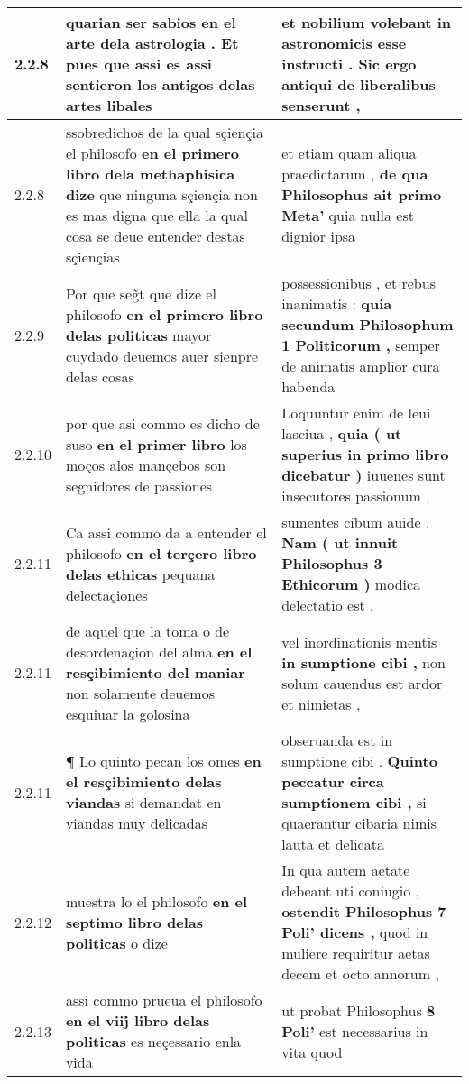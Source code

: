 \begin{tabular}{|p{1cm}|p{6.5cm}|p{6.5cm}|}
2.2.8 & quarian ser sabios \textbf{ en el arte dela astrologia . } Et pues que assi es assi sentieron los antigos delas artes libales & et nobilium volebant \textbf{ in astronomicis esse instructi . } Sic ergo antiqui de liberalibus senserunt , \\\hline
2.2.8 & ssobredichos de la qual sçiençia el philosofo \textbf{ en el primero libro dela methaphisica dize } que ninguna sçiençia non es mas digna que ella la qual cosa se deue entender destas sçiençias & et etiam quam aliqua praedictarum , \textbf{ de qua Philosophus ait primo Meta’ } quia nulla est dignior ipsa \\\hline
2.2.9 & Por que seg̃t que dize el philosofo \textbf{ en el primero libro delas politicas } mayor cuydado deuemos auer sienpre delas cosas & possessionibus , et rebus inanimatis : \textbf{ quia secundum Philosophum 1 Politicorum , } semper de animatis amplior cura habenda \\\hline
2.2.10 & por que asi commo es dicho de suso \textbf{ en el primer libro } los moços alos mançebos son segnidores de passiones & Loquuntur enim de leui lasciua , \textbf{ quia ( ut superius in primo libro dicebatur ) } iuuenes sunt insecutores passionum , \\\hline
2.2.11 & Ca assi commo da a entender el philosofo \textbf{ en el terçero libro delas ethicas } pequana delectaçiones & sumentes cibum auide . \textbf{ Nam ( ut innuit Philosophus 3 Ethicorum ) } modica delectatio est , \\\hline
2.2.11 & de aquel que la toma o de desordenaçion del alma \textbf{ en el resçibimiento del maniar } non solamente deuemos esquiuar la golosina & vel inordinationis mentis \textbf{ in sumptione cibi , } non solum cauendus est ardor et nimietas , \\\hline
2.2.11 & ¶ Lo quinto pecan los omes \textbf{ en el resçibimiento delas viandas } si demandat en viandas muy delicadas & obseruanda est in sumptione cibi . \textbf{ Quinto peccatur circa sumptionem cibi , } si quaerantur cibaria nimis lauta et delicata \\\hline
2.2.12 & muestra lo el philosofo \textbf{ en el septimo libro delas politicas } o dize & In qua autem aetate debeant uti coniugio , \textbf{ ostendit Philosophus 7 Poli’ dicens , } quod in muliere requiritur aetas decem et octo annorum , \\\hline
2.2.13 & assi commo prueua el philosofo \textbf{ en el viij̊ libro delas politicas } es neçessario enla vida & ut probat Philosophus \textbf{ 8 Poli’ } est necessarius in vita quod \\\hline

\end{tabular}
